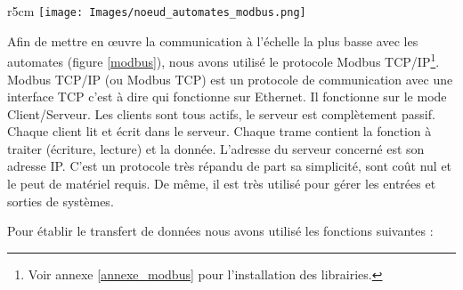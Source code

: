 \documentclass[a4paper,french, titlepage]{book}
\begin{document}
\begin{wrapfigure}[16]{r}{5cm}
\texttt{[image: Images/noeud\_automates\_modbus.png]}
\caption{Échange de données entre le nœud \emph{Automates} et les API par liaison Modbus TCP/IP}
\label{modbus}
\end{wrapfigure}

Afin de mettre en œuvre la communication à l'échelle la plus basse avec les automates (figure \ref{modbus}), nous avons utilisé le protocole Modbus TCP/IP\footnote{Voir annexe \ref{annexe_modbus} pour l'installation des librairies.}.\\ 

Modbus TCP/IP (ou Modbus TCP) est un protocole de communication avec une interface TCP c'est à dire qui fonctionne sur Ethernet. Il fonctionne sur le mode Client/Serveur. Les clients sont tous actifs, le serveur est complètement passif. Chaque client lit et écrit dans le serveur. Chaque trame contient la fonction à traiter (écriture, lecture) et la donnée. L'adresse du serveur concerné est son adresse IP. C'est un protocole très répandu de part sa simplicité, sont coût nul et le peut de matériel requis. De même, il est très utilisé pour gérer les entrées et sorties de systèmes.\\

\vspace{1cm}

Pour établir le transfert de données nous avons utilisé les fonctions suivantes :
\end{document}
